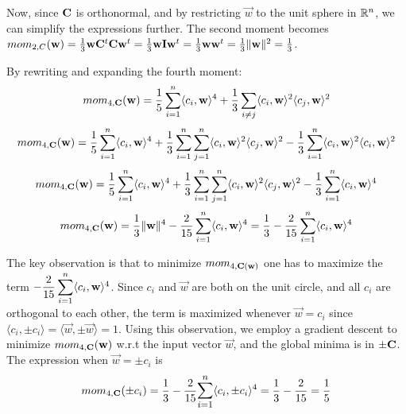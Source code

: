 Now, since $\mathbf{C}$ is orthonormal, and by restricting $\vec{w}$ to the unit sphere in $\mathbb{R}^n$, we can simplify the expressions further.
The second moment becomes $mom_{2, C}(\mathbf{w}) = \frac{1}{3} \mathbf{w} \mathbf{C}^t \mathbf{C} \mathbf{w}^t = \frac{1}{3}\mathbf{w} \mathbf{I} \mathbf{w}^t 
= \frac{1}{3} \mathbf{w}\mathbf{w}^t = \frac{1}{3} \lVert \mathbf{w} \rVert ^2 = \frac{1}{3}$. 

By rewriting and expanding the fourth moment:
\[ mom_{4, \mathbf{C}} (\mathbf{w}) = \frac{1}{5} \sum_{i=1}^{n} \langle c_i, \mathbf{w} \rangle ^4 + \frac{1}{3} \sum_{i \neq j} \langle c_i, \mathbf{w} \rangle ^2 \langle c_j, \mathbf{w} \rangle ^2\]
\[ mom_{4, \mathbf{C}} (\mathbf{w}) = \frac{1}{5} \sum_{i=1}^{n} \langle c_i, \mathbf{w} \rangle ^4 + 
    \frac{1}{3} \sum_{i=1}^{n} \sum_{j=1}^n \langle c_i, \mathbf{w} \rangle ^2 \langle c_j, \mathbf{w} \rangle ^2 -
\frac{1}{3}\sum_{i=1}^{n} \langle c_i, \mathbf{w} \rangle ^2 \langle c_i, \mathbf{w} \rangle ^2\]
\[ mom_{4, \mathbf{C}} (\mathbf{w}) = \frac{1}{5} \sum_{i=1}^{n} \langle c_i, \mathbf{w} \rangle ^4 + 
\frac{1}{3} \sum_{i=1}^n \sum_{j=1}^n \langle c_i, \mathbf{w} \rangle ^2 \langle c_j, \mathbf{w} \rangle ^2 -
\frac{1}{3}\sum_{i=1}^{n} \langle c_i, \mathbf{w} \rangle ^4 \]
\[ mom_{4, \mathbf{C}} (\mathbf{w}) = \frac{1}{3} \lVert \mathbf{w} \rVert ^4 - 
    \frac{2}{15}\sum_{i=1}^{n} \langle c_i, \mathbf{w} \rangle ^4 = \frac{1}{3} - 
\frac{2}{15}\sum_{i=1}^n \langle c_i, \mathbf{w} \rangle ^4\]


The key observation is that to minimize $mom_{4, \mathbf{C}(\mathbf{w})}$ one has to maximize the term 
$ \mathlarger{-\frac{2}{15}\sum_{i=1}^{n}} \langle c_i, \vec{w} \rangle ^4$. Since $c_i$ and $\vec{w}$ are both on the unit circle, and
all $c_i$ are orthogonal to each other, the term is maximized whenever $\vec{w} = c_i$ since $\langle c_i, \pm c_i \rangle = \langle \vec{w}, \pm \vec{w} \rangle = 1$.
Using this observation, we employ a gradient descent to minimize $mom_{4, \mathbf{C}}(\mathbf{w})$ w.r.t the input vector $\vec{w}$, and the global minima is in $\pm \mathbf{C}$.
The expression when $\vec{w} = \pm c_i$ is 
\[
    mom_{4, \mat{C}}(\pm c_i) = \frac{1}{3} - \frac{2}{15} \mathlarger{\sum_{i=1}^{n}} \langle c_i, \pm c_i \rangle ^4
    = \frac{1}{3} - \frac{2}{15} = \frac{1}{5}
\]

